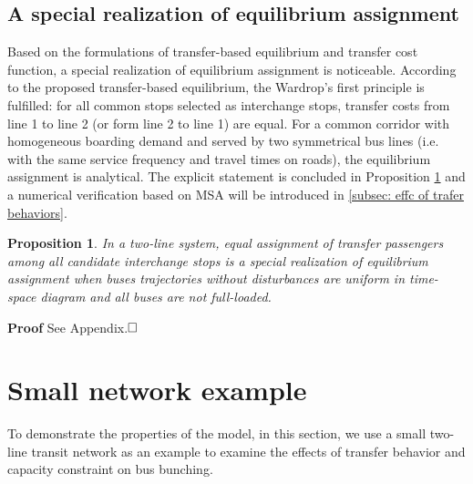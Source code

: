 \documentclass[smallextended]{svjour3}       %
\newtheorem{mypro}[proposition]{Proposition}
\begin{document}
\begin{Abstract}
\subsection{A special realization of equilibrium assignment}
Based on the formulations of transfer-based equilibrium and transfer cost function, a special realization of equilibrium assignment is noticeable.
According to the proposed transfer-based equilibrium, the Wardrop's first principle is fulfilled: 
for all common stops selected as interchange stops, transfer costs from line 1 to line 2 (or form line 2 to line 1) are equal.
For a common corridor with homogeneous boarding demand and served by two symmetrical bus lines (i.e. with the same service frequency and travel times on roads), the equilibrium assignment is analytical.
The explicit statement is concluded in Proposition \ref{pro:equal assignment} and a numerical verification based on MSA will be introduced in \ref{subsec: effc of trafer behaviors}. 
\begin{mypro}\label{pro:equal assignment}
    In a two-line system, equal assignment of transfer passengers among all candidate interchange stops is a special realization of equilibrium assignment when buses trajectories without disturbances are uniform in time-space diagram and all buses are not full-loaded. 
\end{mypro}
\noindent \textbf{Proof} See Appendix.$\hfill\square$ 

\section{Small network example}\label{example}
To demonstrate the properties of the model, in this section, we use a small two-line transit network as an example to examine the effects of transfer behavior and capacity constraint on bus bunching. 


\end{Abstract}
\end{document}
